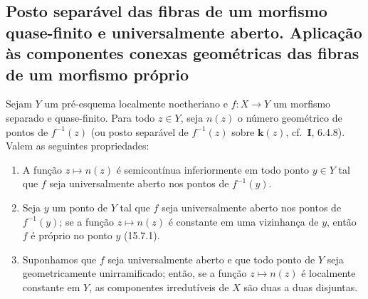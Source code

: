 \subsection{Posto separável das fibras de um morfismo quase-finito e universalmente aberto. Aplicação às componentes conexas geométricas das fibras de um morfismo próprio}
\label{subsection:IV.15.5}

\begin{proposition}[15.5.1]
\label{IV.15.5.1}
Sejam $Y$ um pré-esquema localmente noetheriano e $f:X\to Y$ um morfismo separado e quase-finito. Para todo $z\in Y$, seja $n(z)$ o número geométrico de pontos de $f^{-1}(z)$ (ou posto separável de $f^{-1}(z)$ sobre $\mathbf{k}(z)$, cf.\ \textbf{I}, 6.4.8). Valem as seguintes propriedades:
\begin{enumerate}[label=\emph{(\roman*)}]
  \item A função $z\mapsto n(z)$ é semicontínua inferiormente em todo ponto $y\in Y$ tal que $f$ seja universalmente aberto nos pontos de $f^{-1}(y)$.
  \item Seja $y$ um ponto de $Y$ tal que $f$ seja universalmente aberto nos pontos de $f^{-1}(y)$; se a função $z\mapsto n(z)$ é constante em uma vizinhança de $y$, então $f$ é próprio no ponto $y$ (15.7.1).
  \item Suponhamos que $f$ seja universalmente aberto e que todo ponto de $Y$ seja geometricamente unirramificado; então, se a função $z\mapsto n(z)$ é localmente constante em $Y$, as componentes irredutíveis de $X$ são duas a duas disjuntas.
\end{enumerate}
\end{proposition}

